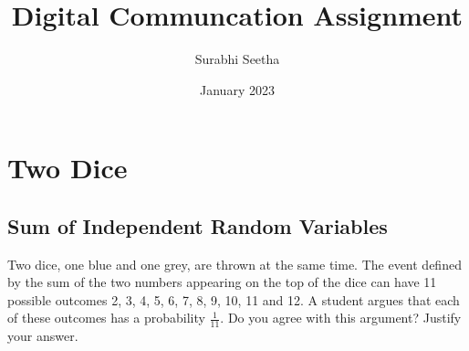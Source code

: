 \documentclass[journal,10pt,twocolumn]{IEEEtran}
\numberwithin{equation}{subsection}
\numberwithin{figure}{subsection}
\begin{document}
\title{Digital Communcation Assignment}

\author{Surabhi Seetha}
\date{January 2023}

\maketitle

\tableofcontents

\bigskip


\section{Two Dice}
\subsection{\textbf{Sum of Independent Random Variables}}
Two dice, one blue and one grey, are thrown at the same time.   The event defined by the sum of the two numbers appearing on the top of the dice can have 11 possible outcomes 2, 3, 4, 5, 6, 7, 8, 9, 10, 11 and 12.  A student argues that each of these outcomes has a probability $\frac{1}{11}$.  Do you agree with this argument?  Justify your answer.
\end{document}
